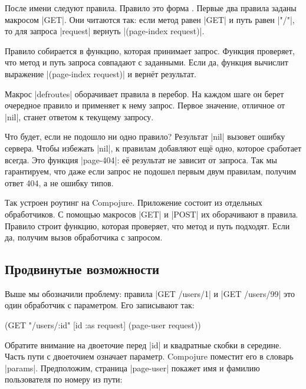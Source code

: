 После имени следуют правила. Правило это форма .
Первые два правила заданы макросом \spverb|GET|. Они читаются так:
если метод равен \spverb|GET| и путь равен \spverb|"/"|, то для запроса
\spverb|request| вернуть \spverb|(page-index request)|.

Правило собирается в функцию, которая принимает запрос. Функция проверяет, что
метод и путь запроса совпадают с заданными. Если да, функция вычислит выражение
\spverb|(page-index request)| и верн\"{е}т результат.


Макрос \spverb|defroutes| оборачивает правила в перебор. На каждом шаге он берет
очередное правило и применяет к нему запрос. Первое значение, отличное от
\spverb|nil|, станет ответом к текущему запросу.

Что будет, если не подошло ни одно правило? Результат \spverb|nil| вызовет
ошибку сервера. Чтобы избежать \spverb|nil|, к правилам добавляют ещ\"{е} одно,
которое сработает всегда. Это функция \spverb|page-404|: е\"{е} результат не
зависит от запроса. Так мы гарантируем, что даже если запрос не подошел первым
двум правилам, получим ответ 404, а не ошибку типов.

Так устроен роутинг на Compojure. Приложение состоит из отдельных
обработчиков. С помощью макросов \spverb|GET| и \spverb|POST| их оборачивают в
правила. Правило строит функцию, которая проверяет, что метод и путь
подходят. Если да, получим вызов обработчика с запросом.

\subsection{Продвинутые возможности}

Выше мы обозначили проблему: правила \spverb|GET /users/1|
и \spverb|GET /users/99| это один обработчик с параметром. Его записывают так:


\begin{english}
  \begin{clojure}
(GET "/users/:id" [id :as request] (page-user request))
  \end{clojure}
\end{english}

Обратите внимание на двоеточие перед \spverb|id| и квадратные скобки в середине.
Часть пути с двоеточием означает параметр. Compojure поместит его в словарь
\spverb|params|. Предположим, страница \spverb|page-user| покажет имя и фамилию
пользователя по номеру из пути:

